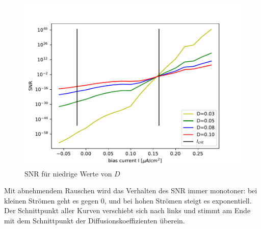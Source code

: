 \documentclass[12pt,a4paper]{article}
\begin{document}
\begin{figure}[H]
	\centering
	\includegraphics[scale=1]{SNRpred.pdf}\caption{SNR für niedrige Werte von $D$}
	\label{snrpred}
\end{figure}
Mit abnehmendem Rauschen wird das Verhalten des SNR immer monotoner: bei kleinen Strömen geht es gegen 0, und bei hohen Strömen steigt es exponentiell. Der Schnittpunkt aller Kurven verschiebt sich nach links und stimmt am Ende mit dem Schnittpunkt der Diffusionskoeffizienten überein.
\end{document}
